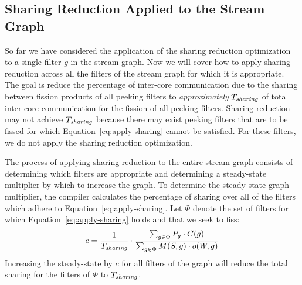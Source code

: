 \subsection{Sharing Reduction Applied to the Stream Graph}
So far we have considered the application of the sharing reduction
optimization to a single filter $g$ in the stream graph.  Now we will
cover how to apply sharing reduction across all the filters of the
stream graph for which it is appropriate.  The goal is reduce the
percentage of inter-core communication due to the sharing between
fission products of all peeking filters to {\it approximately}
$T_{\relax{\it sharing}}$ of total inter-core communication for the fission
of all peeking filters.  Sharing reduction may not achieve
$T_{\relax{\it sharing}}$ because there may exist peeking filters that are to
be fissed for which Equation~\ref{eq:apply-sharing} cannot be
satisfied.  For these filters, we do not apply the sharing reduction
optimization.

The process of applying sharing reduction to the entire stream graph
consists of determining which filters are appropriate and determining
a steady-state multiplier by which to increase the graph.  To
determine the steady-state graph multiplier, the compiler calculates
the percentage of sharing over all of the filters which adhere to
Equation~\ref{eq:apply-sharing}.  Let $\Phi$ denote the set of filters
for which Equation~\ref{eq:apply-sharing} holds and that we seek to
fiss:
{\ninepoint
\begin{equation}
\label{eq:sr-mult}
c = \frac{1}{T_{\mt{sharing}}} \cdot \frac{\sum_{g \in \Phi} P_g \cdot C(g) }{\sum _{g \in
    \Phi} M(S, g) \cdot o(W, g)}
\end{equation}
}
\noindent Increasing the steady-state by $c$ for all filters of the
graph will reduce the total sharing for the filters of $\Phi$ to
$T_{\relax{\it sharing}}$.  







